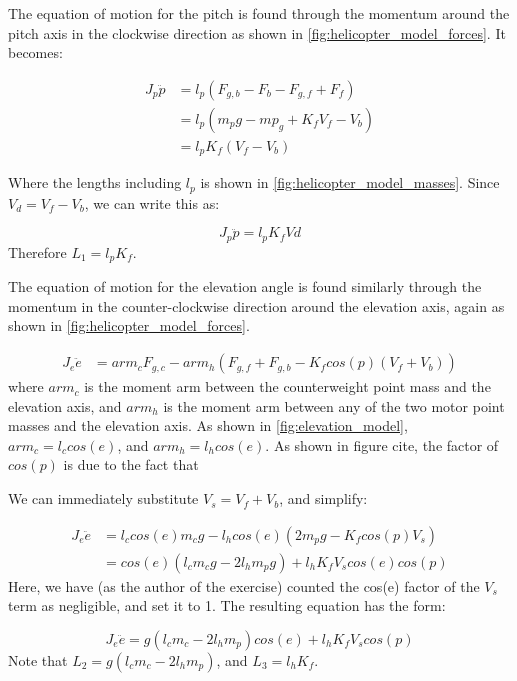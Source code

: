 The equation of motion for the pitch is found through the momentum
around the pitch axis in the clockwise direction as shown in
\cref{fig:helicopter_model_forces}. It becomes:

\begin{align*}
  J_p\ddot{p} &= l_p(F_{g,b} - F_b - F_{g,f} + F_f) \\
              &= l_p(m_pg - mp_g + K_fV_f - V_b) \\
              &= l_pK_f(V_f-V_b)
\end{align*}

Where the lengths including $l_p$ is shown in
\cref{fig:helicopter_model_masses}. Since $V_d = V_f-V_b$, we can
write this as:

\begin{equation}
  \label{eq:pitch EoM}
  J_p\ddot{p} = l_pK_fVd
\end{equation}
Therefore $L_1 = l_pK_f$.

The equation of motion for the elevation angle is found similarly
through the momentum in the counter-clockwise direction around the
elevation axis, again as shown in \cref{fig:helicopter_model_forces}.

\begin{align*}
  J_e\ddot{e} &= arm_cF_{g,c} - arm_h(F_{g,f}+F_{g,b} - K_fcos(p)(V_f + V_b))
\end{align*}
where $arm_c$ is the moment arm between the counterweight point mass
and the elevation axis, and $arm_h$ is the moment arm between any of
the two motor point masses and the elevation axis. As shown in
\cref{fig:elevation_model}, $arm_c = l_ccos(e)$, and $arm_h =
l_hcos(e)$. As shown in figure cite, the factor of $cos(p)$ is due to the fact that

We can immediately substitute $V_s = V_f + V_b$, and simplify:

\begin{align*}
  J_e\ddot{e} &= l_ccos(e)m_cg - l_hcos(e)(2m_pg - K_fcos(p)V_s) \\
              &= cos(e)(l_cm_cg - 2l_hm_pg) + l_hK_fV_scos(e)cos(p)
\end{align*}
Here, we have (as the author of the exercise) counted the cos(e)
factor of the $V_s$ term as negligible, and set it to 1.  The resulting equation has the form:

\begin{equation}
  \label{eq:elevation EoM}
  J_e\ddot{e} = g(l_cm_c - 2l_hm_p)cos(e) + l_hK_fV_scos(p)
\end{equation}
Note that $L_2 = g(l_cm_c-2l_hm_p)$, and $L_3 = l_hK_f$.

